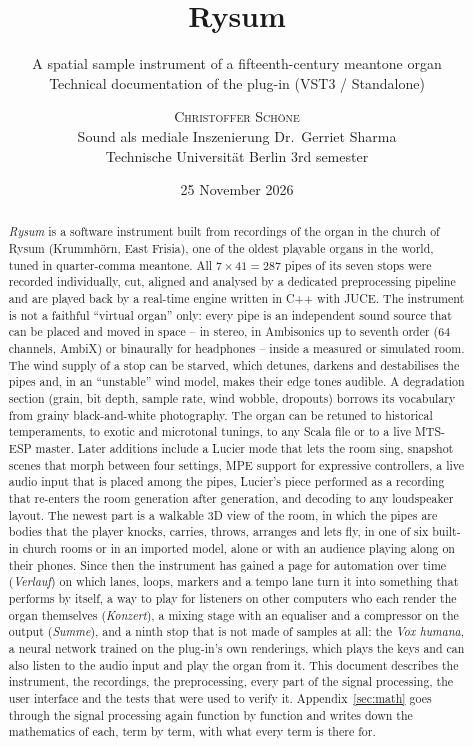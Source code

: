 \documentclass[11pt,a4paper,parskip=half,DIV=11,toc=bibliography]{scrartcl}
\title{\frakfont\fontsize{64}{66}\selectfont Rysum\vspace{0.3em}}
\subtitle{A spatial sample instrument of a fifteenth-century meantone organ\\[0.4em]
  \normalsize Technical documentation of the plug-in (VST3 / Standalone)}
\author{\textsc{Christoffer Schöne}\\[0.2em]
  \small Sound als mediale Inszenierung \textperiodcentered{} Dr.\ Gerriet Sharma \\
  \small Technische Universität Berlin \textperiodcentered{} 3rd semester}
\date{25 November 2026}
\begin{document}
\maketitle

\begin{abstract}
\noindent
\emph{Rysum} is a software instrument built from recordings of the organ in the church of
Rysum (Krummhörn, East Frisia), one of the oldest playable organs in the world, tuned in
quarter-comma meantone. All $7\times41=287$ pipes of its seven stops were recorded individually,
cut, aligned and analysed by a dedicated preprocessing pipeline and are played back by a
real-time engine written in C++ with JUCE. The instrument is not a faithful
\enquote{virtual organ} only: every pipe is an independent sound source that can be placed and
moved in space -- in stereo, in Ambisonics up to seventh order (64 channels, AmbiX) or binaurally for
headphones -- inside a measured or simulated room. The wind supply of a stop can be starved, which
detunes, darkens and destabilises the pipes and, in an \enquote{unstable} wind model, makes their
edge tones audible. A degradation section (grain, bit depth, sample rate, wind wobble, dropouts)
borrows its vocabulary from grainy black-and-white photography. The organ can be retuned to
historical temperaments, to exotic and microtonal tunings, to any Scala file or to a live
MTS-ESP master. Later additions include a Lucier mode that lets the room sing, snapshot scenes that morph between four settings, MPE support for expressive controllers, a live audio input that is placed among the pipes, Lucier's piece performed as a recording that re-enters the room generation after generation, and decoding to any loudspeaker layout. The newest part is a
walkable 3D view of the room, in which the pipes are bodies that the player knocks, carries, throws, arranges and lets fly, in one of six built-in
church rooms or in an imported model, alone or with an audience playing along on their phones. Since then the instrument has gained a page for
automation over time (\emph{Verlauf}) on which lanes, loops, markers and a tempo lane turn it into something that performs by itself, a way to play for
listeners on other computers who each render the organ themselves (\emph{Konzert}), a mixing stage with an equaliser and a compressor on the
output (\emph{Summe}), and a ninth stop that is not made of samples at all: the \emph{Vox humana}, a neural network trained on the plug-in's own
renderings, which plays the keys and can also listen to the audio input and play the organ from it. This document describes the instrument, the recordings, the preprocessing, every
part of the signal processing, the user interface and the tests that were used to verify it. Appendix~\ref{sec:math} goes
through the signal processing again function by function and writes down the mathematics of each, term by term, with what
every term is there for.
\end{abstract}
\end{document}
